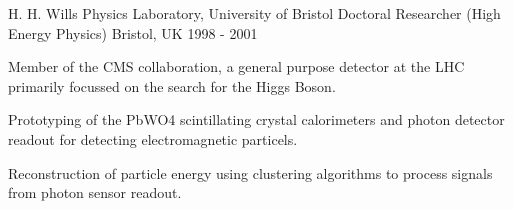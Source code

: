 \begin{cventries}
\cventry
{H. H. Wills Physics Laboratory, University of Bristol} %
{Doctoral Researcher (High Energy Physics)} %
{Bristol, UK} %
{1998 - 2001} %
{
  \begin{cvitems} %
    \item {
        Member of the CMS collaboration, a general purpose detector at the LHC primarily
        focussed on the search for the Higgs Boson.}
    \item {
        Prototyping of the PbWO4 scintillating crystal calorimeters and photon detector readout for 
        detecting electromagnetic particels.
        }
    \item {
        Reconstruction of particle energy using clustering algorithms to process signals from photon sensor readout.
    }
  \end{cvitems}
}

\end{cventries}